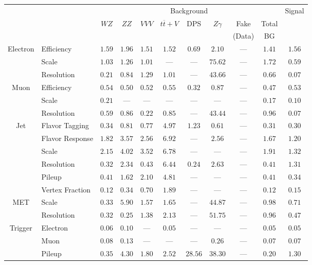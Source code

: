 \small\renewcommand{\tabcolsep}{4pt}
\begin{tabular}{|cl||ccccccc|c||c|}
\hline
 & & \multicolumn{8}{c||}{Background} & Signal \\ 
 & & $WZ$ & $ZZ$ & $VVV$ & $t\overline{t}+V$ & DPS & $Z\gamma$ & Fake & Total & \\ 
 & & &  &  &  &  &  & (Data) & BG & \\ 
\hline\hline
\multirow{3}{*}{Electron}
& Efficiency  & $ 1.59$  & $ 1.96$  & $ 1.51$  & $ 1.52$  & $ 0.69$  & $ 2.10$  & ---  & $ 1.41$  & $ 1.56$ \\ 
\cline{2-11}
& Scale  & $ 1.03$  & $ 1.26$  & $ 1.01$  & ---  & ---  & $ 75.62$  & ---  & $ 1.72$  & $ 0.59$ \\ 
\cline{2-11}
& Resolution & $0.21$& $0.84$& $1.29$& $1.01$&  --- & $43.66$&  --- & $0.66$& $0.07$\\ 
\hline
\multirow{3}{*}{Muon}
& Efficiency & $0.54$& $0.50$& $0.52$& $0.55$& $0.32$& $0.87$&  --- & $0.47$& $0.53$\\ 
\cline{2-11}
& Scale & $0.21$&  --- &  --- &  --- &  --- &  --- &  --- & $0.17$& $0.10$\\ 
\cline{2-11}
& Resolution  & $ 0.59$  & $ 0.86$  & $ 0.22$  & $ 0.85$  & ---  & $ 43.44$  & ---  & $ 0.96$  & $ 0.07$ \\ 
\hline
\multirow{6}{*}{Jet}
& Flavor Tagging  & $ 0.34$  & $ 0.81$  & $ 0.77$  & $ 4.97$  & $ 1.23$  & $ 0.61$  & ---  & $ 0.31$  & $ 0.30$ \\ 
\cline{2-11}
& Flavor Response  & $ 1.82$  & $ 3.57$  & $ 2.56$  & $ 6.92$  & ---  & $ 2.56$  & ---  & $ 1.67$  & $ 1.20$ \\ 
\cline{2-11}
& Scale  & $ 2.15$  & $ 4.02$  & $ 3.52$  & $ 6.78$  & ---  & ---  & ---  & $ 1.91$  & $ 1.32$ \\ 
\cline{2-11}
& Resolution & $0.32$& $2.34$& $0.43$& $6.44$& $0.24$& $2.63$&  --- & $0.41$& $1.31$\\ 
\cline{2-11}
& Pileup  & $ 0.41$  & $ 1.62$  & $ 2.10$  & $ 4.81$  & ---  & ---  & ---  & $ 0.41$  & $ 0.34$ \\ 
\cline{2-11}
& Vertex Fraction & $0.12$& $0.34$& $0.70$& $1.89$&  --- &  --- &  --- & $0.12$& $0.15$\\ 
\hline
\multirow{2}{*}{MET}
& Scale & $0.33$& $5.90$& $1.57$& $1.65$&  --- & $44.87$&  --- & $0.98$& $0.71$\\ 
\cline{2-11}
& Resolution & $0.32$& $0.25$& $1.38$& $2.13$&  --- & $51.75$&  --- & $0.96$& $0.47$\\ 
\hline
\multirow{2}{*}{Trigger}
& Electron & $0.06$& $0.10$&  --- & $0.05$&  --- &  --- &  --- & $0.05$& $0.05$\\ 
\cline{2-11}
& Muon & $0.08$& $0.13$&  --- &  --- &  --- & $0.26$&  --- & $0.07$& $0.07$\\ 
\hline
& Pileup & $0.35$& $4.30$& $1.80$& $2.52$& $28.56$& $38.30$&  --- & $0.20$& $1.30$\\ 
\hline
\end{tabular}
